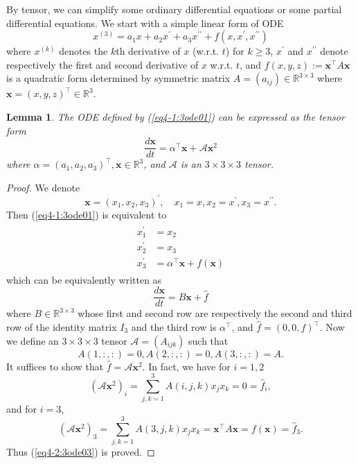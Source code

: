 \documentclass[11pt, oneside]{article}  %
\newtheorem{lem}[thm]{Lemma}
\newcommand{\al}{\alpha}
\newcommand{\p}{\prime}
\newcommand{\RR}{\mathbb{R}}
\newcommand{\A}{\mathcal{A}}
\newcommand{\bx}{\textbf{x}}
\newcommand{\beq}{\begin{equation}}
\newcommand{\eeq}{\end{equation}}
\newcommand{\bey}{\begin{eqnarray}}
\newcommand{\eey}{\end{eqnarray}}
\begin{document}
By tensor, we can simplify some ordinary differential equations or some partial differential equations. We start with a simple linear form of ODE 
\beq\label{eq4-1:3ode01}
x^{(3)} = a_{1}x +a_{2}x^{\p} +a_{3} x^{\p\p}+ f(x,x^{\p},x^{\p\p}) 
\eeq
where $x^{(k)}$ denotes the $k$th derivative of $x$ (w.r.t. $t$) for $k\ge 3$, $x^{\p}$ and $x^{\p\p}$ denote respectively the first and second 
derivative of $x$ w.r.t. $t$, and $f(x,y,z):=\bx^{\top}A\bx$ is a quadratic form determined by symmetric matrix $A=(a_{ij})\in\RR^{3\times 3}$ 
where $\bx=(x,y,z)^{\top}\in\RR^{3}$.  
\begin{lem}\label{le4-1}
The ODE defined by (\ref{eq4-1:3ode01}) can be expressed as the tensor form 
\beq\label{eq4-2:3ode03} 
\frac{d \bx}{dt} = \al^{\top}\bx+\A\bx^2 
\eeq 
where $\al=(a_{1},a_{2},a_{3})^{\top}, \bx\in\RR^3$, and $\A$ is an $3\times 3\times 3$ tensor. 
\end{lem}
\begin{proof}
We denote  
\[ 
\bx = (x_{1},x_{2},x_{3})^{\p}, \quad  x_{1}=x,  x_{2}=x^{\p}, x_{3}=x^{\p\p}.
\]
Then (\ref{eq4-1:3ode01}) is equivalent to   
\bey\label{eq4-3:3ode04}
\begin{aligned}
	x_{1}^{\p} &= x_{2} \\
	x_{2}^{\p} &= x_{3} \\
	x_{3}^{\p} &= \al^{\top}\bx +f(\bx) 
\end{aligned}
\eey
which can be equivalently written as 
\beq\label{eq4-4:3ode05}
\frac{d\bx}{dt} = B\bx +\hat{f}
\eeq
where $B\in\RR^{3\times 3}$ whose first and second row are respectively the second and third row of the identity matrix $I_{3}$ and the third
row is $\al^{\top}$, and $\hat{f}=(0,0,f)^{\top}$.  Now we define an $3\times 3\times 3$ tensor $\A=(A_{ijk})$ such that  
\[ A(1, :, :) =0, A(2,:,:) =0, A(3,:,:) =A. \]
It suffices to show that $\hat{f}=\A\bx^2$. In fact, we have for $i=1,2$
\[ (\A\bx^2)_i =\sum_{j,k=1}^{3} A(i,j,k)x_j x_k =0 = \hat{f}_i, \]
and for $i=3$,
\[ (\A\bx^2)_3 =\sum_{j,k=1}^{3} A(3,j,k)x_j x_k =\bx^{\top}A\bx=f(\bx)=\hat{f}_3. \]
Thus (\ref{eq4-2:3ode03}) is proved.
\end{proof}
\end{document}
